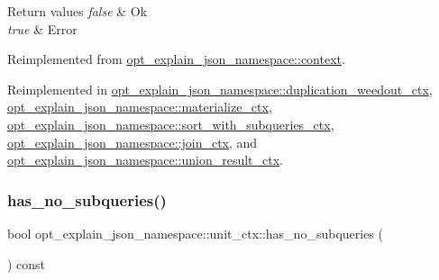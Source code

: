 \begin{DoxyRetVals}{Return values}
{\em false} & Ok \\
\hline
{\em true} & Error \\
\hline
\end{DoxyRetVals}


Reimplemented from \mbox{\hyperlink{classopt__explain__json__namespace_1_1context_ad9df2d2b16093c51e1c5557227b2fd56}{opt\+\_\+explain\+\_\+json\+\_\+namespace\+::context}}.



Reimplemented in \mbox{\hyperlink{classopt__explain__json__namespace_1_1duplication__weedout__ctx_a2b570476015c26f58d8b7ec13cc11b4d}{opt\+\_\+explain\+\_\+json\+\_\+namespace\+::duplication\+\_\+weedout\+\_\+ctx}}, \mbox{\hyperlink{classopt__explain__json__namespace_1_1materialize__ctx_adcc1a9841e17f5abf74faf8d719d9700}{opt\+\_\+explain\+\_\+json\+\_\+namespace\+::materialize\+\_\+ctx}}, \mbox{\hyperlink{classopt__explain__json__namespace_1_1sort__with__subqueries__ctx_a57c77821336044d261cca101925dfdf2}{opt\+\_\+explain\+\_\+json\+\_\+namespace\+::sort\+\_\+with\+\_\+subqueries\+\_\+ctx}}, \mbox{\hyperlink{classopt__explain__json__namespace_1_1join__ctx_a5005892466618a6abcc3a5971c1d7433}{opt\+\_\+explain\+\_\+json\+\_\+namespace\+::join\+\_\+ctx}}, and \mbox{\hyperlink{classopt__explain__json__namespace_1_1union__result__ctx_a9e6c30603c339d970f2c8609fdda759a}{opt\+\_\+explain\+\_\+json\+\_\+namespace\+::union\+\_\+result\+\_\+ctx}}.

\mbox{\label{classopt__explain__json__namespace_1_1unit__ctx_a9b2badee39a1d53dccdc909b9e5e4d04}} 
\subsubsection{\texorpdfstring{has\+\_\+no\+\_\+subqueries()}{has\_no\_subqueries()}}
{\footnotesize\ttfamily bool opt\+\_\+explain\+\_\+json\+\_\+namespace\+::unit\+\_\+ctx\+::has\+\_\+no\+\_\+subqueries (\begin{DoxyParamCaption}{ }\end{DoxyParamCaption}) const\hspace{0.3cm}{\ttfamily [inline]}}

